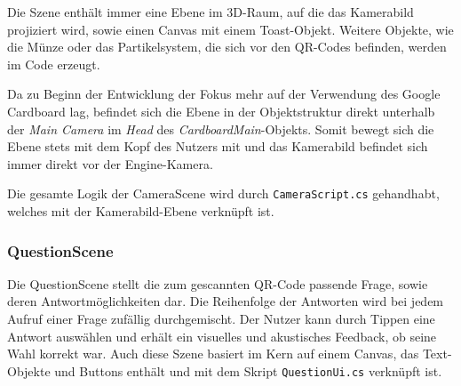 Die Szene enthält immer eine Ebene im 3D-Raum, auf die das Kamerabild projiziert wird, sowie einen Canvas mit einem Toast-Objekt. Weitere Objekte, wie die Münze oder das Partikelsystem, die sich vor den QR-Codes befinden, werden im Code erzeugt.

Da zu Beginn der Entwicklung der Fokus mehr auf der Verwendung des Google Cardboard lag, befindet sich die Ebene in der Objektstruktur direkt unterhalb der \emph{Main Camera} im \emph{Head} des \emph{CardboardMain}-Objekts. Somit bewegt sich die Ebene stets mit dem Kopf des Nutzers mit und das Kamerabild befindet sich immer direkt vor der Engine-Kamera.

Die gesamte Logik der CameraScene wird durch \texttt{CameraScript.cs} gehandhabt, welches mit der Kamerabild-Ebene verknüpft ist.

\subsubsection{QuestionScene}
\label{subs:QuestionScene}
Die QuestionScene stellt die zum gescannten QR-Code passende Frage, sowie deren Antwortmöglichkeiten dar. Die Reihenfolge der Antworten wird bei jedem Aufruf einer Frage zufällig durchgemischt. Der Nutzer kann durch Tippen eine Antwort auswählen und erhält ein visuelles und akustisches Feedback, ob seine Wahl korrekt war. Auch diese Szene basiert im Kern auf einem Canvas, das Text-Objekte und Buttons enthält und mit dem Skript \texttt{QuestionUi.cs} verknüpft ist.
